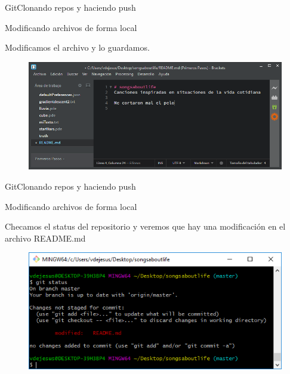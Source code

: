 \documentclass[10pt]{beamer}
\begin{document}
\begin{frame}{Git}{Clonando repos y haciendo push}

\begin{block}{Modificando archivos de forma local}

Modificamos el archivo y lo guardamos.

\begin{figure}[h!]
\centering
\includegraphics [scale=0.45]{filechange}
\label{fig:filechange}
\end{figure}

\end{block}

\end{frame}

\begin{frame}{Git}{Clonando repos y haciendo push}

\begin{block}{Modificando archivos de forma local}

Checamos el status del repositorio y veremos que hay una modificación en el archivo README.md

\begin{figure}[h!]
\centering
\includegraphics [scale=0.45]{gitstatus2}
\label{fig:gitstatus2}
\end{figure}

\end{block}

\end{frame}
\end{document}
